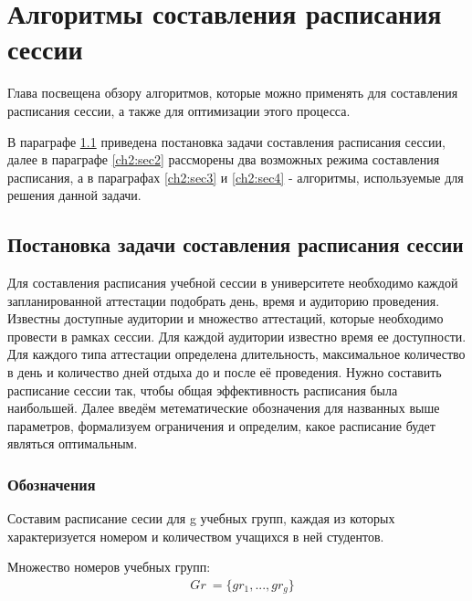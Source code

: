 \chapter{Алгоритмы составления расписания сессии} \label{ch2}
	

Глава посвещена обзору алгоритмов, которые можно применять для составления расписания сессии, а также для оптимизации этого процесса. 

В параграфе \ref{ch2:sec1} приведена постановка задачи составления расписания сессии, далее в параграфе \ref{ch2:sec2} рассморены два возможных режима составления расписания, а в параграфах \ref{ch2:sec3} и \ref{ch2:sec4} - алгоритмы, используемые для решения данной задачи. 

\section{Постановка задачи составления расписания сессии} \label{ch2:sec1} 

Для составления расписания учебной сессии в университете необходимо каждой запланированной аттестации подобрать день, время и аудиторию проведения. 
Известны доступные аудитории и множество аттестаций, которые необходимо провести в рамках сессии. Для каждой аудитории известно время ее доступности. Для каждого типа аттестации определена длительность, максимальное количество в день и количество дней отдыха до и после её проведения. Нужно составить расписание сессии так, чтобы общая эффективность расписания была наибольшей. Далее введём метематические обозначения для названных выше параметров, формализуем ограничения и определим, какое расписание будет являться оптимальным.

\subsection{Обозначения} 

Составим расписание сесии для g учебных групп, каждая из которых характеризуется номером и количеством учащихся в ней студентов. 

Множество номеров учебных групп: 
\begin{align}
	& Gr\ =  \{ gr_1,...,gr_g \} 
\end{align}

